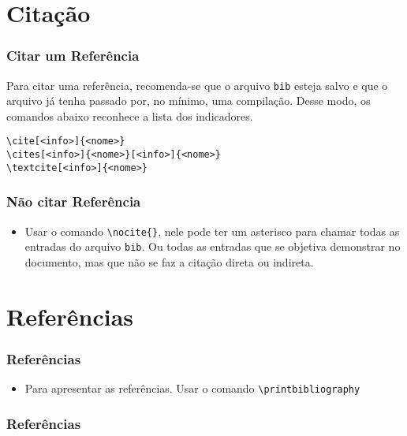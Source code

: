 \documentclass[brazilian,a4paper]{beamer}
\begin{document}
\section{Citação}
\begin{frame}[fragile]
    \frametitle{Citar um Referência}

    Para citar uma referência, recomenda-se que o arquivo \texttt{bib} esteja salvo e que o arquivo já tenha passado por, no mínimo, uma compilação. Desse modo, os comandos abaixo reconhece a lista dos indicadores. 

\begin{lstlisting}[style=myStyleLatex]
\cite[<info>]{<nome>}
\cites[<info>]{<nome>}[<info>]{<nome>}
\textcite[<info>]{<nome>}
\end{lstlisting}

\end{frame}

\begin{frame}[fragile]
    \frametitle{Não citar Referência}

    \begin{itemize}
        \item Usar o comando \lstinline[style=myStyleLatex]!\nocite{}!, nele pode ter um asterisco para chamar todas as entradas do arquivo \texttt{bib}. Ou todas as entradas que se objetiva demonstrar no documento, mas que não se faz a citação direta ou indireta.
    \end{itemize}

\end{frame}

\section{Referências}

\begin{frame}[fragile]
    \frametitle{Referências}

    \begin{itemize}
        \item Para apresentar as referências. Usar o comando \lstinline[style=myStyleLatex]!\printbibliography!
    \end{itemize}

\end{frame}


\begin{frame}[allowframebreaks]
    \frametitle{Referências}

    \nocite{*}
    \printbibliography[keyword=inserirReferencias]

\end{frame}
\end{document}
